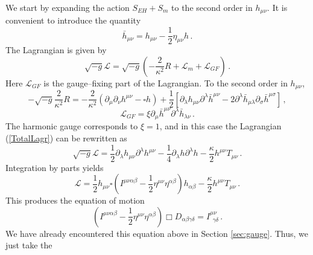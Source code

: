 \documentclass[12pt]{article}
\begin{document}
We start by expanding the action $S_{EH}+S_m$ to the second order in $h_{\mu\nu}$. It is convenient to introduce the quantity
\begin{equation}
\bar{h}_{\mu\nu}=h_{\mu\nu}-\dfrac{1}{2}\eta_{\mu\nu}h \,.
\end{equation}
The Lagrangian is given by
\begin{equation}\label{TotalLagr}
\sqrt{-g}\mathcal{L}=\sqrt{-g}\left(-\dfrac{2}{\kappa^2}R+\mathcal{L}_m+\mathcal{L}_{GF}\right) \,.
\end{equation}
Here $\mathcal{L}_{GF}$ is the gauge--fixing part of the Lagrangian. To the second order in $h_{\mu\nu}$,
\begin{equation}
\label{eq:Rquadrat}
-\sqrt{-g}\dfrac{2}{\kappa^2}R=-\dfrac{2}{\kappa^2}(\partial_\mu\partial_\nu h^{\mu\nu}-\square h)+\dfrac{1}{2}\left[\partial_\lambda h_{\mu\nu}\partial^\lambda\bar{h}^{\mu\nu}-2\partial^\lambda\bar{h}_{\mu\lambda}\partial_\sigma\bar{h}^{\mu\sigma}\right] \,,
\end{equation}
\begin{equation}
\mathcal{L}_{GF}=\xi\partial_\mu\bar{h}^{\mu\nu}\partial^\lambda\bar{h}_{\lambda\nu} \,.
\end{equation}
The harmonic gauge corresponds to $\xi=1$, and in this case the Lagrangian (\ref{TotalLagr}) can be rewritten as
\begin{equation}
\sqrt{-g}\mathcal{L}=\dfrac{1}{2}\partial_\lambda h_{\mu\nu}\partial^\lambda h^{\mu\nu}-\dfrac{1}{4}\partial_\lambda h\partial^\lambda h-\dfrac{\kappa}{2}h^{\mu\nu}T_{\mu\nu} \,.
\end{equation}
Integration by parts yields
\begin{equation}\label{TotalLagrSimpl}
\mathcal{L}=\dfrac{1}{2}h_{\mu\nu}\square\left(I^{\mu\nu\alpha\beta}-\dfrac{1}{2}\eta^{\mu\nu}\eta^{\alpha\beta}\right)h_{\alpha\beta}-\dfrac{\kappa}{2}h^{\mu\nu}T_{\mu\nu}\,.
\end{equation}
This produces the equation of motion
\begin{equation}
 \left(I^{\mu\nu\alpha\beta}-\dfrac{1}{2}\eta^{\mu\nu}\eta^{\alpha\beta}\right)\Box  D_{\alpha\beta\gamma\delta}=I^{\mu\nu}_{~~\gamma\delta} \,.
\end{equation}
We have already encountered this equation above in Section \ref{sec:gauge}. Thus, we just take the
\end{document}
